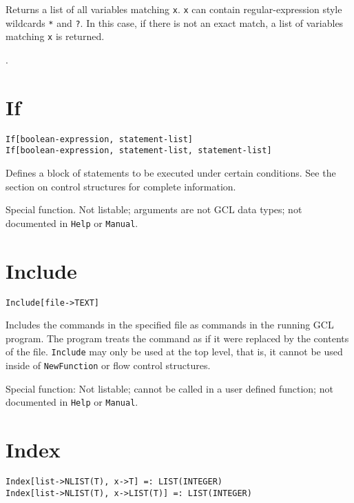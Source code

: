 \noindent
Returns a list of all variables matching \verb+x+.  \verb+x+ can
contain regular-expression style wildcards \verb+*+ and \verb+?+.  In
this case, if there is not an exact match, a list of variables
matching \verb+x+ is returned.

\seealso {}.


\section*{If}\label{PrimIf}
\begin{verbatim}
If[boolean-expression, statement-list]
If[boolean-expression, statement-list, statement-list]
\end{verbatim}
  
\noindent
Defines a block of statements to be executed under certain conditions.
See the section on control structures for complete information. 

\note Special function.  Not listable; arguments are not GCL
data types; not documented in \verb+Help+ or \verb+Manual+.  


\section*{Include}\label{PrimInclude}
\begin{verbatim}
Include[file->TEXT]
\end{verbatim}

\noindent
Includes the commands in the specified file as commands
in the running GCL program.  The program treats the command as if it
were replaced by the contents of the file.  \verb+Include+ may only be used
at the top level, that is, it cannot be used inside of \verb+NewFunction+
or flow control structures.

\note Special function:  Not listable; cannot be called in a
user defined function; not documented in \verb+Help+ or \verb+Manual+. 


\section*{Index}\label{PrimIndex}
\begin{verbatim}
Index[list->NLIST(T), x->T] =: LIST(INTEGER) 
Index[list->NLIST(T), x->LIST(T)] =: LIST(INTEGER) 
\end{verbatim}
\foralltypes

